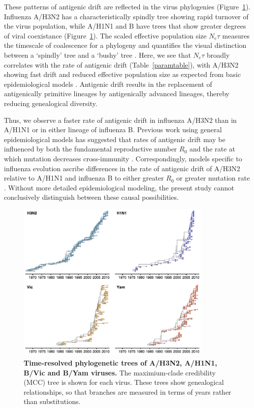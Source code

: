 \documentclass[11pt,oneside,letterpaper]{article}
\begin{document}
These patterns of antigenic drift are reflected in the virus phylogenies (Figure~\ref{trees}).
Influenza A/H3N2 has a characteristically spindly tree showing rapid turnover of the virus population, while A/H1N1 and B have trees that show greater degrees of viral coexistance (Figure~\ref{trees}).
The scaled effective population size $N_e \tau$ measures the timescale of coalescence for a phylogeny and quantifies the visual distinction between a `spindly' tree and a `bushy' tree \cite{Bedford11}.
Here, we see that $N_e \tau$ broadly correlates with the rate of antigenic drift (Table~\ref{paramtable}), with A/H3N2 showing fast drift and reduced effective population size as expected from basic epidemiological models \cite{Bedford12}.
Antigenic drift results in the replacement of antigenically primitive lineages by antigenically advanced lineages, thereby reducing genealogical diversity.

Thus, we observe a faster rate of antigenic drift in influenza A/H3N2 than in A/H1N1 or in either lineage of influenza B.
Previous work using general epidemiological models has suggested that rates of antigenic drift may be influenced by both the fundamental reproductive number $R_0$ and the rate at which mutation decreases cross-immunity \cite{Gog02,Lin03}.
Correspondingly, models specific to influenza evolution ascribe differences in the rate of antigenic drift of A/H3N2 relative to A/H1N1 and influenza B to either greater $R_0$ or greater mutation rate \cite{Ferguson03,Bedford12}.
Without more detailed epidemiological modeling, the present study cannot conclusively distinguish between these causal possibilities.

\begin{figure}[h]
	\centering		
	\includegraphics[width=0.85\textwidth]{figures/trees}
	\caption{\textbf{Time-resolved phylogenetic trees of A/H3N2, A/H1N1, B/Vic and B/Yam viruses.} 
	The maximium-clade credibility (MCC) tree is shown for each virus.
	These trees show genealogical relationships, so that branches are measured in terms of years rather than substitutions.} 
	\label{trees} 
\end{figure}
\end{document}
